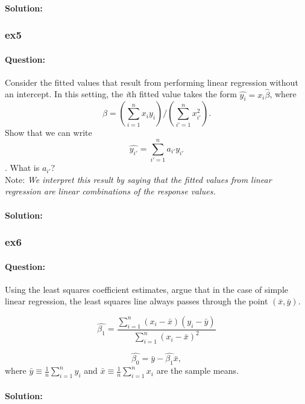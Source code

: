 \documentclass[a4paper,12pt,titlepage]{article} %
\begin{document}
\paragraph{Solution:}

\subsubsection{ex5}
\paragraph{Question:} Consider the fitted values that result from performing linear regression without an intercept. In this setting, the \textit{i}th fitted value takes the form $\hat{y_{i}} = x_{i} \hat{\beta}$, where $$\beta = \left( \displaystyle\sum_{i=1}^{n} x_{i} y_{i} \right) / \left( \displaystyle\sum_{i'=1}^{n} x_{i'}^{2} \right).$$ Show that we can write $$ \hat{y_{i'}} = \displaystyle\sum_{i'=1}^{n} a_{i'} y_{i'}$$. What is $a_{i'}$?\\

Note: \textit{We interpret this result by saying that the fitted values from linear regression are linear combinations of the response values.}

\paragraph{Solution:}

\subsubsection{ex6}
	
\paragraph{Question:} Using the least squares coefficient estimates, argue that in the case of simple linear regression, the least squares line always passes through the point $(\bar{x},\bar{y})$.

$$ \hat{\beta_{1}} = \frac{\sum_{i=1}^{n} (x_{i}-\bar{x}) (y_{i}-\bar{y})}{ \sum_{i=1}^{n} (x_{i}-\bar{x})^{2} } $$

$$ \hat{\beta_{0}} = \bar{y} - \hat{\beta_{1}} \bar{x}, $$ where $\bar{y} \equiv \frac{1}{n} \sum_{i=1}^{n} y_{i} $ and $\bar{x} \equiv \frac{1}{n} \sum_{i=1}^{n} x_{i} $ are the sample means.

\paragraph{Solution:}
\end{document}
